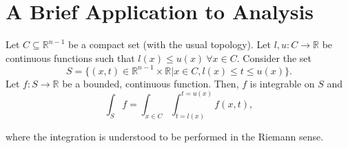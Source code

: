 
\chapter{A Brief Application to Analysis}\label{chapter:A Brief Application to Analysis}
\setcounter{section}{1}
\begin{prop}\label{proposition:integral over a simple region}
    Let \(C\subseteq\mathbb{R}^{n-1}\) be a compact set (with the usual topology). Let \(l,u\colon C\to\mathbb{R}\) be continuous functions such that \(l(x)\leq u(x)~\forall x\in C\). Consider the set
    \[
        S=\{(x,t)\in\mathbb{R}^{n-1}\times\mathbb{R}\left|x\in C, l(x)\leq t\leq u(x)\right.\}
    .\]
    Let \(f\colon S\to \mathbb{R}\) be a bounded, continuous function. Then, \(f\) is integrable on \(S\) and 
    \[
        \int_S f = \int_{x\in C}\int_{t=l(x)}^{t=u(x)} f(x,t)
    ,\]
    
    where the integration is understood to be performed in the Riemann sense.  
\end{prop}
